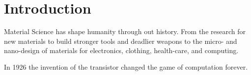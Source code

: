 \chapter{Introduction}
\label{ch:introduction}
Material Science has shape humanity through out history. From the research for new materials to build stronger tools and deadlier weapons to the micro- and nano-design of materials for electronics, clothing, health-care, and computing.

In 1926 the invention of the transistor changed the game of computation forever.
